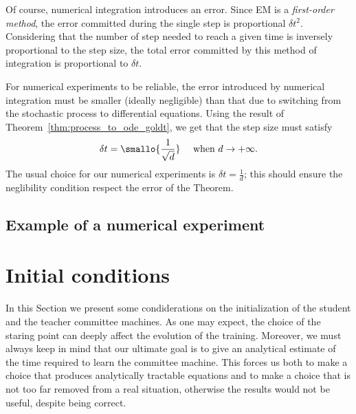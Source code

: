 Of course, numerical integration introduces an error.
Since EM is a \emph{first-order method},
the error committed during the single step is proportional \(\delta t^2\).
Considering that the number of step needed to reach a given time is inversely proportional
to the step size, the total error committed by this method of integration
is proportional to \(\delta t\).

For numerical experiments to be reliable, the error introduced by numerical integration
must be smaller (ideally negligible) than that due to switching from the stochastic process
to differential equations. Using the result of Theorem~\ref{thm:process_to_ode_goldt},
we get that the step size must satisfy
\[
  \delta t = \smallo{\frac{1}{\sqrt{d}}}\quad \text{ when }d\to+\infty.
\]
The usual choice for our numerical experiments is \(\delta t = \frac1d\);
this should ensure the neglibility condition respect the error of the Theorem.

\subsection{Example of a numerical experiment}

\section{Initial conditions}
In this Section we present some condiderations on the initialization of the student
and the teacher committee machines. As one may expect, the choice of the staring point 
can deeply affect the evolution of the training.
Moreover, we must always keep in mind that our ultimate goal is to give
an analytical estimate of the time required to learn the committee machine.
This forces us both to make a choice that produces analytically tractable equations
and to make a choice that is not too far removed from a real situation,
otherwise the results would not be useful, despite being correct.

